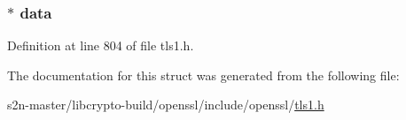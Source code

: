 \subsubsection[{\texorpdfstring{data}{data}}]{ $\ast$ data}\hypertarget{structtls__session__ticket__ext__st_ac5c5967f62e5c3601479be651a8ed76c}{}\label{structtls__session__ticket__ext__st_ac5c5967f62e5c3601479be651a8ed76c}


Definition at line 804 of file tls1.\+h.



The documentation for this struct was generated from the following file\+:\begin{DoxyCompactItemize}
\item 
s2n-\/master/libcrypto-\/build/openssl/include/openssl/\hyperlink{include_2openssl_2tls1_8h}{tls1.\+h}\end{DoxyCompactItemize}
